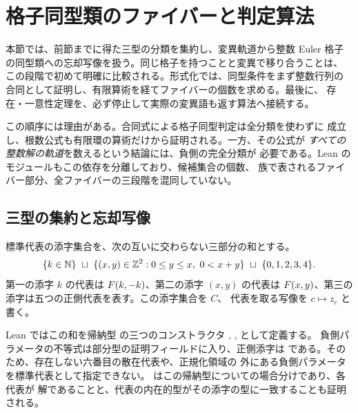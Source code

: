 \section{格子同型類のファイバーと判定算法}

本節では、前節までに得た三型の分類を集約し、変異軌道から整数 Euler
格子の同型類への忘却写像を扱う。同じ格子を持つことと変異で移り合うことは、
この段階で初めて明確に比較される。形式化では、同型条件をまず整数行列の
合同として証明し、有限算術を経てファイバーの個数を求める。最後に、
存在・一意性定理を、必ず停止して実際の変異語も返す算法へ接続する。

この順序には理由がある。合同式による格子同型判定は全分類を使わずに
成立し、根数公式も有限環の算術だけから証明される。一方、その公式が
\emph{すべての整数解の軌道}を数えるという結論には、負側の完全分類が
必要である。Lean のモジュールもこの依存を分離しており、候補集合の個数、
族で表されるファイバー部分、全ファイバーの三段階を混同していない。

\subsection{三型の集約と忘却写像}

\begin{definition}[標準代表の添字型]
\label{bp:full-canonical}
\leanok
{}
標準代表の添字集合を、次の互いに交わらない三部分の和とする。
\[
 \{k\in\mathbb N\}\ \sqcup\
 \{(x,y)\in\mathbb Z^2:0\le y\le x,\ 0<x+y\}\ \sqcup\ \{0,1,2,3,4\}.
\]
第一の添字 $k$ の代表は $F(k,-k)$、第二の添字 $(x,y)$ の代表は
$F(x,y)$、第三の添字は五つの正側代表を表す。この添字集合を $C$、
代表を取る写像を $c\mapsto z_c$ と書く。
\end{definition}

Lean ではこの和を帰納型  の三つのコンストラクタ
, ,  として定義する。
負側パラメータの不等式は部分型の証明フィールドに入り、正側添字は
 である。そのため、存在しない六番目の散在代表や、正規化領域の
外にある負側パラメータを標準代表として指定できない。
 はこの帰納型についての場合分けであり、各代表が
解であることと、代表の内在的型がその添字の型に一致することも証明される。

